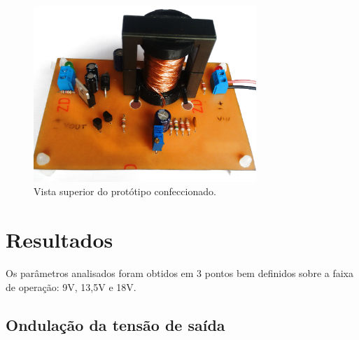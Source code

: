 \documentclass[a4paper]{article}
\begin{document}
{\begin{figure}[H]
	\centering
	\includegraphics[width=0.75\textwidth]{c2.jpg}
	\caption{Vista superior do protótipo confeccionado.}
	\label{fig:top-confec}
\end{figure}

\clearpage


\section{Resultados}
\label{sec:resultados}

Os parâmetros analisados foram obtidos em 3 pontos bem definidos sobre a faixa de operação: 9V, 13,5V e 18V.

\subsection{Ondulação da tensão de saída}

}
\end{document}
